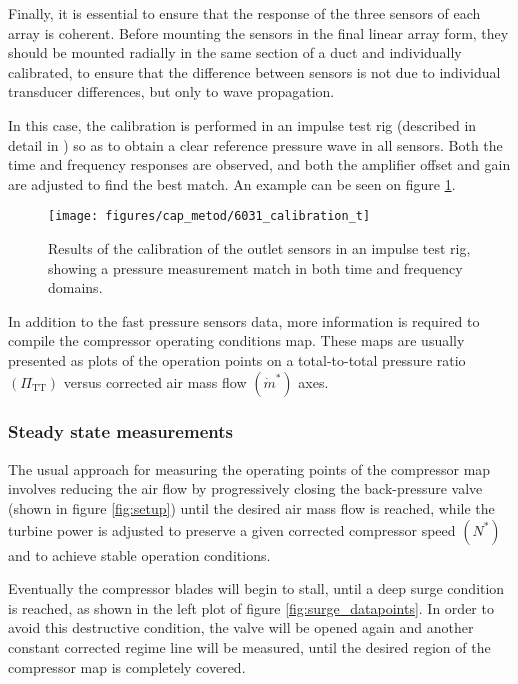 Finally, it is essential to ensure that the response of the three sensors of each array is coherent. Before mounting the sensors in the final linear array form, they should be mounted radially in the same section of a duct and individually calibrated, to ensure that the difference between sensors is not due to individual transducer differences, but only to wave propagation.

In this case, the calibration is performed in an impulse test rig (described in detail in \cite{payri2000modified}) so as to obtain a clear reference pressure wave in all sensors. Both the time and frequency responses are observed, and both the amplifier offset and gain are adjusted to find the best match. An example can be seen on figure \ref{fig:6031_calibration}.

\begin{figure}[t!]
\centering
\texttt{[image: figures/cap\_metod/6031\_calibration\_t]}
\caption{Results of the calibration of the outlet sensors in an impulse test rig, showing a pressure measurement match in both time and frequency domains.}
\label{fig:6031_calibration}
\end{figure}

In addition to the fast pressure sensors data, more information is required to compile the compressor operating conditions map. These maps are usually presented as plots of the operation points on a total-to-total pressure ratio $(\Pi_\text{TT})$ versus corrected air mass flow $(\dot m^*)$ axes.

\subsubsection{Steady state measurements}
\label{sub:steady_state_measurements}

The usual approach for measuring the operating points of the compressor map involves reducing the air flow by progressively closing the back-pressure valve (shown in figure \ref{fig:setup}) until the desired air mass flow is reached, while the turbine power is adjusted to preserve a given corrected compressor speed $(N^*)$ and to achieve stable operation conditions.

Eventually the compressor blades will begin to stall, until a deep surge condition is reached, as shown in the left plot of figure \ref{fig:surge_datapoints}. In order to avoid this destructive condition, the valve will be opened again and another constant corrected regime line will be measured, until the desired region of the compressor map is completely covered.

